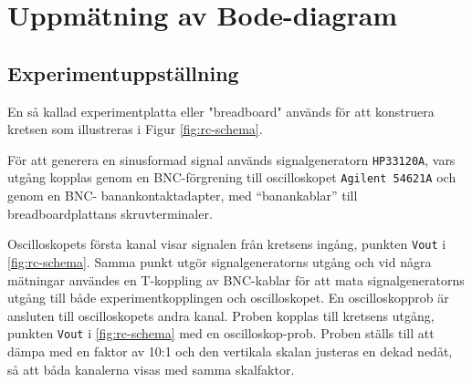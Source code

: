 %
%

\section{Uppmätning av Bode-diagram}\label{bode}

\subsection{Experimentuppställning}\label{}
En så kallad experimentplatta eller "breadboard" används för att konstruera
kretsen som illustreras i Figur \ref{fig:rc-schema}.
\par För att generera en sinusformad signal används signalgeneratorn \texttt{HP33120A},
vars utgång kopplas genom en BNC-förgrening till oscilloskopet \texttt{Agilent 54621A}
och genom en BNC- banankontaktadapter, med ``banankablar'' till
breadboardplattans skruvterminaler.
\par Oscilloskopets första kanal visar signalen från kretsens ingång, punkten
\texttt{Vout} i \ref{fig:rc-schema}. Samma punkt utgör signalgeneratorns
utgång och vid några mätningar användes en T-koppling av BNC-kablar för att 
mata signalgeneratorns utgång till både experimentkopplingen och oscilloskopet.
En oscilloskopprob är ansluten till oscilloskopets andra kanal. Proben kopplas
till kretsens utgång, punkten \texttt{Vout} i \ref{fig:rc-schema} med en
oscilloskop-prob. Proben ställs till att dämpa med en faktor av 10:1 och den
vertikala skalan justeras en dekad
nedåt, så att båda kanalerna visas med samma skalfaktor.


